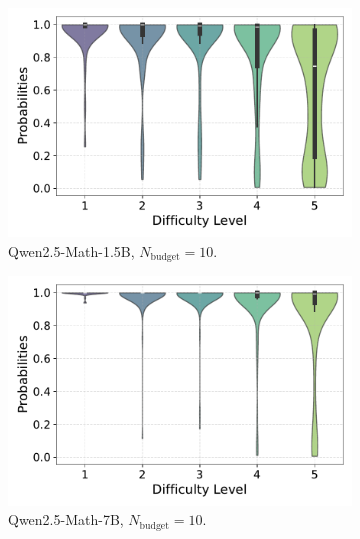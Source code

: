 \begin{figure}[h!]
  \centering
  \begin{subfigure}{0.49\textwidth}
      \centering
      \includegraphics[width=\textwidth]{figs/QWEN-MATH-1.5B_violin_maj10_probability_adaptive_04_NO_ground_truth.pdf}
      \caption{Qwen2.5-Math-1.5B, $N_{\text{budget}}=10$.}
      \label{fig:QWEN-MATH-1.5B_budget_10_NO_04}
  \end{subfigure}
  \hfill
  \begin{subfigure}{0.49\textwidth}
      \centering
      \includegraphics[width=\textwidth]{figs/QWEN-MATH-7B_violin_maj10_probability_adaptive_04_NO_ground_truth.pdf}
        \caption{Qwen2.5-Math-7B, $N_{\text{budget}}=10$.}
      \label{fig:QWEN-MATH-7B_budget_10_NO_04}
  \end{subfigure}
  \vfill
  \begin{subfigure}{0.49\textwidth}
      \centering

\end{subfigure}
\end{figure}
